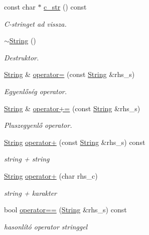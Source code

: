 \begin{DoxyCompactItemize}
const char $\ast$ \mbox{\hyperlink{class_string_a0274f3e61533d15086816fb7f47ccb54}{c\+\_\+str}} () const
\begin{DoxyCompactList}\small\item\em C-\/stringet ad vissza. \end{DoxyCompactList}\item 
\mbox{\hyperlink{class_string_ac40b2a3fb58c2d8556f5e6ff73510036}{$\sim$\+String}} ()
\begin{DoxyCompactList}\small\item\em Destruktor. \end{DoxyCompactList}\item 
\mbox{\hyperlink{class_string}{String}} \& \mbox{\hyperlink{class_string_a803e6112834d4c0cdb0da6c6a4000e6e}{operator=}} (const \mbox{\hyperlink{class_string}{String}} \&rhs\+\_\+s)
\begin{DoxyCompactList}\small\item\em Egyenlőség operator. \end{DoxyCompactList}\item 
\mbox{\hyperlink{class_string}{String}} \& \mbox{\hyperlink{class_string_ac203e7c52e04bb86f62f9dd75527b361}{operator+=}} (const \mbox{\hyperlink{class_string}{String}} \&rhs\+\_\+s)
\begin{DoxyCompactList}\small\item\em Pluszegyenlő operator. \end{DoxyCompactList}\item 
\mbox{\hyperlink{class_string}{String}} \mbox{\hyperlink{class_string_a28a020f061e5f25317af47488bfb7de8}{operator+}} (const \mbox{\hyperlink{class_string}{String}} \&rhs\+\_\+s) const
\begin{DoxyCompactList}\small\item\em string + string \end{DoxyCompactList}\item 
\mbox{\hyperlink{class_string}{String}} \mbox{\hyperlink{class_string_afa169686af6b513e1f059cf2bf39695f}{operator+}} (char rhs\+\_\+c)
\begin{DoxyCompactList}\small\item\em string + karakter \end{DoxyCompactList}\item 
bool \mbox{\hyperlink{class_string_aa94d2477f4f80aad7703bf4d7a39d332}{operator==}} (\mbox{\hyperlink{class_string}{String}} \&rhs\+\_\+s) const
\begin{DoxyCompactList}\small\item\em hasonlító operator stringgel \end{DoxyCompactList}\item 

\end{DoxyCompactItemize}
